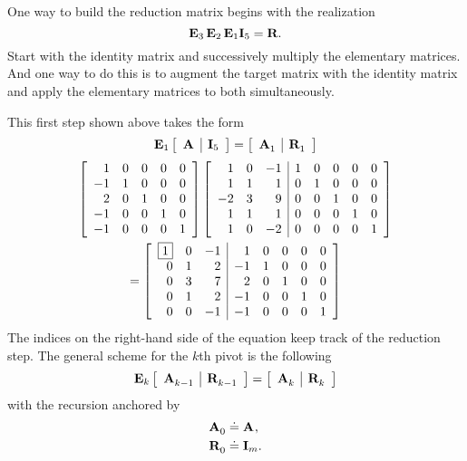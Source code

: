 One way to build the reduction matrix begins with the realization
\begin{equation}
  \E{3} \, \E{2} \, \E{1} \I{5} = \textbf{R}.
\end{equation}
Start with the identity matrix and successively multiply the elementary matrices. And one way to do this is to augment the target matrix with the identity matrix and apply the elementary matrices to both simultaneously.

This first step shown above takes the form
\begin{equation}
  \E{1}\mat{c|c}{\A{}&\I{5}} = \mat{c|c}{\A{}_{1}&\R{}_{1}}
\end{equation}
\begin{multline}%
\mat{ rrrrr }{
  1 & 0 & 0 & 0 & 0 \\
 -1 & 1 & 0 & 0 & 0 \\
  2 & 0 & 1 & 0 & 0 \\
 -1 & 0 & 0 & 1 & 0 \\
 -1 & 0 & 0 & 0 & 1
}
\left[
\begin{array}{ rrr|rrrrr }
  1 & 0 & -1 & 1 & 0 & 0 & 0 & 0 \\
  1 & 1 &  1 & 0 & 1 & 0 & 0 & 0 \\
 -2 & 3 &  9 & 0 & 0 & 1 & 0 & 0 \\
  1 & 1 &  1 & 0 & 0 & 0 & 1 & 0 \\
  1 & 0 & -2 & 0 & 0 & 0 & 0 & 1
\end{array}
\right]\\
=
\mat{rrr|rrrrr}{
 \boxed{1} & 0 & -1 &  1 & 0 & 0 & 0 & 0 \\
         0 & 1 &  2 & -1 & 1 & 0 & 0 & 0 \\
         0 & 3 &  7 &  2 & 0 & 1 & 0 & 0 \\
         0 & 1 &  2 & -1 & 0 & 0 & 1 & 0 \\
         0 & 0 & -1 & -1 & 0 & 0 & 0 & 1
}
\end{multline}%
The indices on the right-hand side of the equation keep track of the reduction step. The general scheme for the $k$th pivot is the following
\begin{equation}
  \E{k}\mat{c|c}{\A{}_{k-1}&\R{}_{k-1}} = \mat{c|c}{\A{}_{k}&\R{}_{k}}
\end{equation}
with the recursion anchored by
\begin{equation}
  \begin{split}
    \A{}_{0} & \doteq \A{},\\
    \R{}_{0} & \doteq \I{m}. 
  \end{split}
\end{equation}

